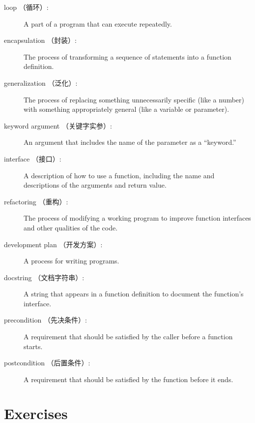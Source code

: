 \documentclass[10pt]{book}
\begin{document}
\begin{CJK}{UTF8}{gbsn}
\begin{description}
\item[loop （循环）:] A part of a program that can execute repeatedly.

\item[encapsulation （封装）:] The process of transforming a sequence of
statements into a function definition.

\item[generalization （泛化）:] The process of replacing something
unnecessarily specific (like a number) with something appropriately
general (like a variable or parameter).

\item[keyword argument （关键字实参）:] An argument that includes the name of
the parameter as a ``keyword.''

\item[interface （接口）:] A description of how to use a function, including
the name and descriptions of the arguments and return value.

\item[refactoring （重构）:] The process of modifying a working program to
  improve function interfaces and other qualities of the code.

\item[development plan （开发方案）:] A process for writing programs.

\item[docstring （文档字符串）:]  A string that appears in a function definition
to document the function's interface.

\item[precondition （先决条件）:] A requirement that should be satisfied by
the caller before a function starts.

\item[postcondition （后置条件）:] A requirement that should be satisfied by
the function before it ends.

\end{description}


\section{Exercises}

\begin{exercise}


\end{exercise}
\end{CJK}
\end{document}
